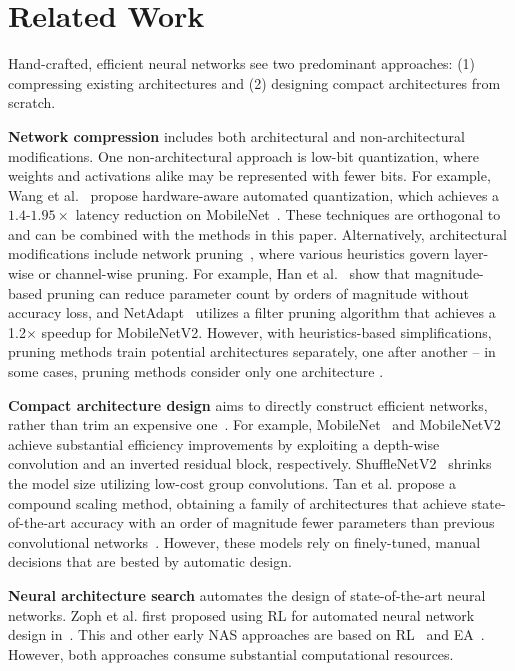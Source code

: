 \documentclass[10pt,twocolumn,letterpaper]{article}
\begin{document}
\section{Related Work}

Hand-crafted, efficient neural networks see two predominant approaches: (1) compressing existing architectures and (2) designing compact architectures from scratch.

\textbf{Network compression} includes both architectural and non-architectural modifications. One non-architectural approach is low-bit quantization, where weights and activations alike may be represented with fewer bits.  For example, Wang et al.~\cite{haq} propose hardware-aware automated quantization, which achieves a $1.4$-$1.95\times$ latency reduction on MobileNet~\cite{mobilenet}. These techniques are orthogonal to and can be combined with the methods in this paper. Alternatively, architectural modifications include network pruning~\cite{netprune, structured_sparsity, energy_aware}, where various heuristics govern layer-wise or channel-wise pruning. For example, Han et al.~\cite{netprune} show that magnitude-based pruning can reduce parameter count by orders of magnitude without accuracy loss, and NetAdapt~\cite{netadapt} utilizes a filter pruning algorithm that achieves a 1.2$\times$ speedup for MobileNetV2. However, with heuristics-based simplifications, pruning methods train potential architectures separately, one after another -- in some cases, pruning methods consider only one architecture \cite{liu2017slimming, he2018sfp}.

\textbf{Compact architecture design} aims to directly construct efficient networks, rather than trim an expensive one~\cite{squeezenet, squeezedet}.  For example, MobileNet~\cite{mobilenet} and MobileNetV2~\cite{mobilenetv2} achieve substantial efficiency improvements by exploiting a depth-wise convolution and an inverted residual block, respectively.  ShuffleNetV2~\cite{shufflenetv2} shrinks the model size utilizing low-cost group convolutions. Tan et al. propose a compound scaling method, obtaining a family of architectures that achieve state-of-the-art accuracy with an order of magnitude fewer parameters than previous convolutional networks~\cite{efficientnet}. However, these models rely on finely-tuned, manual decisions that are bested by automatic design.

\textbf{Neural architecture search} automates the design of state-of-the-art neural networks. Zoph et al. first proposed using RL for automated neural network design in~\cite{NASRL}. This and other early NAS approaches are based on RL~\cite{NASRL, mnasnet} and EA~\cite{evolution}. However, both approaches consume substantial computational resources.
\end{document}
